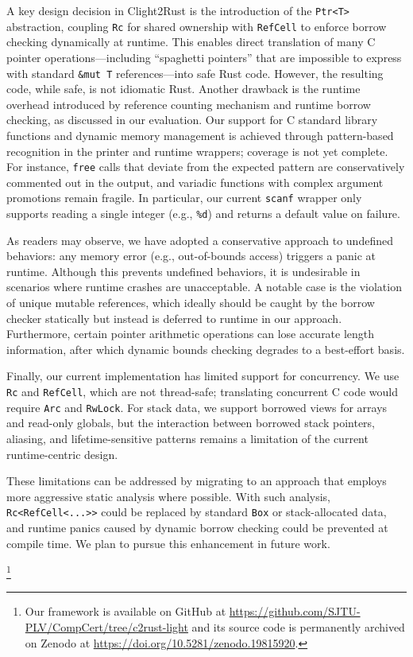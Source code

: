 \documentclass{llncs} %
\begin{document}
A key design decision in Clight2Rust is the introduction of the \texttt{Ptr<T>} abstraction, coupling \texttt{Rc} for shared ownership with \texttt{RefCell} to enforce borrow checking dynamically at runtime. This enables direct translation of many C pointer operations---including ``spaghetti pointers'' that are impossible to express with standard \texttt{\&mut T} references---into safe Rust code. However, the resulting code, while safe, is not idiomatic Rust. Another drawback is the runtime overhead introduced by reference counting mechanism and runtime borrow checking, as discussed in our evaluation. Our support for C standard library functions and dynamic memory management is achieved through pattern-based recognition in the printer and runtime wrappers; coverage is not yet complete. For instance, \texttt{free} calls that deviate from the expected pattern are conservatively commented out in the output, and variadic functions with complex argument promotions remain fragile. In particular, our current \texttt{scanf} wrapper only supports reading a single integer (e.g., \texttt{\%d}) and returns a default value on failure.

As readers may observe, we have adopted a conservative approach to undefined behaviors: any memory error (e.g., out-of-bounds access) triggers a panic at runtime. Although this prevents undefined behaviors, it is undesirable in scenarios where runtime crashes are unacceptable. A notable case is the violation of unique mutable references, which ideally should be caught by the borrow checker statically but instead is deferred to runtime in our approach. Furthermore, certain pointer arithmetic operations can lose accurate length information, after which dynamic bounds checking degrades to a best-effort basis.

Finally, our current implementation has limited support for concurrency. We use \texttt{Rc} and \texttt{RefCell}, which are not thread-safe; translating concurrent C code would require \texttt{Arc} and \texttt{RwLock}. For stack data, we support borrowed views for arrays and read-only globals, but the interaction between borrowed stack pointers, aliasing, and lifetime-sensitive patterns remains a limitation of the current runtime-centric design.

These limitations can be addressed by migrating to an approach that employs more aggressive static analysis where possible. With such analysis, \texttt{Rc<RefCell<\linebreak[0]...{>}{>}} could be replaced by standard \texttt{Box} or stack-allocated data, and runtime panics caused by dynamic borrow checking could be prevented at compile time. We plan to pursue this enhancement in future work.

\footnote{Our framework is available on GitHub at {\small\url{https://github.com/SJTU-PLV/CompCert/tree/c2rust-light}} and its source code is permanently archived on Zenodo at {\small\url{https://doi.org/10.5281/zenodo.19815920}}.}
\end{document}
